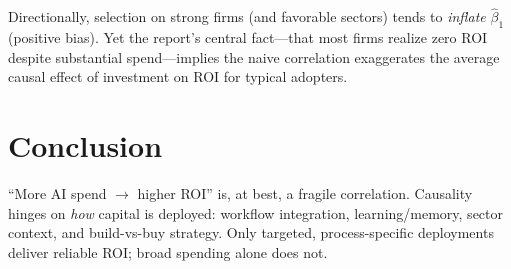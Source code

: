 \documentclass[11pt]{article}
\begin{document}
Directionally, selection on strong firms (and favorable sectors) tends to \emph{inflate} $\hat{\beta}_1$ (positive bias). Yet the report’s central fact—that most firms realize zero ROI despite substantial spend—implies the naive correlation exaggerates the average causal effect of investment on ROI for typical adopters.

\section*{Conclusion}
“More AI spend $\rightarrow$ higher ROI” is, at best, a fragile correlation. Causality hinges on \emph{how} capital is deployed: workflow integration, learning/memory, sector context, and build-vs-buy strategy. Only targeted, process-specific deployments deliver reliable ROI; broad spending alone does not.
\end{document}
